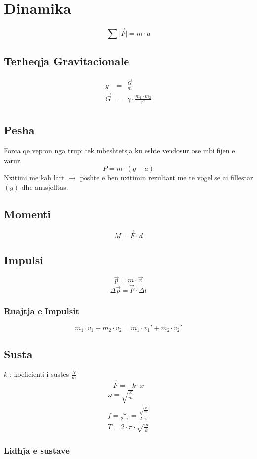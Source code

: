 \documentclass[a4paper, twocolumn]{article}
\begin{document}
\section{Dinamika}
\[\sum  \mid \vec{F}  \mid = m \cdot a\]
\subsection{Terheqja Gravitacionale}
\begin{eqnarray*}
	g&=& \frac{\vec{G}}{m} \\
	\vec{G}&=&\gamma \cdot\frac{m_1 \cdot m_2}{r^2}\\
\end{eqnarray*}
\subsection{Pesha}
Forca qe vepron nga trupi tek mbeshtetsja ku eshte vendosur ose mbi fijen e varur.
\[ P = m \cdot \left( g-a \right)  \]
Nxitimi me kah lart $\to$ poshte e ben nxitimin rezultant me te vogel se ai fillestar $\left( g \right)$ dhe anasjelltas.
\subsection{Momenti}
\[
	M=\vec{F} \cdot d
\]
\subsection{Impulsi}
\[
	\vec{p} = m \cdot \vec{v}
\]
\[
	\Delta \vec{p} = \vec{F} \cdot  \Delta t
\]
\subsubsection{Ruajtja e Impulsit}
\[
	m_1 \cdot  v_1 + m_2 \cdot v_2 = m_1\cdot v_{1}'+ m_2\cdot v_{2}'
\]
\subsection{Susta}
$k$ : koeficienti i sustes  $\frac{N}{m}$
\[
	\vec{F} = - k \cdot x
\]
\begin{gather*}
	\omega = \sqrt{\frac{k}{m}} \\
	f = \frac{\omega}{2\cdot \pi} = \frac{\sqrt{\frac{k}{m}}}{2 \cdot \pi} \\
	T = 2 \cdot \pi \cdot \sqrt{\frac{m}{k}}
\end{gather*}
\subsubsection{Lidhja e sustave}
\end{document}
